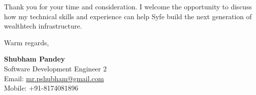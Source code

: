 \documentclass[a4paper,10pt]{article}
\begin{document}
\vspace{6pt}
Thank you for your time and consideration. I welcome the opportunity to discuss how my technical skills and experience can help Syfe build the next generation of wealthtech infrastructure.

\vspace{12pt}
Warm regards,

\vspace{6pt}
\textbf{Shubham Pandey} \\
Software Development Engineer 2 \\
Email: \href{mailto:mr.pshubham@gmail.com}{mr.pshubham@gmail.com} \\
Mobile: +91-8174081896
\end{document}
